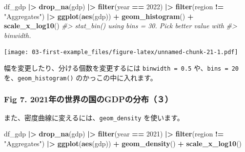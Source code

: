 \documentclass[
  xelatex, ja=standard]{bxjsbook}
\newenvironment{Shaded}{\begin{snugshade}}{\end{snugshade}}
\newcommand{\CommentTok}[1]{\textcolor[rgb]{0.56,0.35,0.01}{\textit{#1}}}
\newcommand{\DecValTok}[1]{\textcolor[rgb]{0.00,0.00,0.81}{#1}}
\newcommand{\FunctionTok}[1]{\textcolor[rgb]{0.13,0.29,0.53}{\textbf{#1}}}
\newcommand{\NormalTok}[1]{#1}
\newcommand{\SpecialCharTok}[1]{\textcolor[rgb]{0.81,0.36,0.00}{\textbf{#1}}}
\newcommand{\StringTok}[1]{\textcolor[rgb]{0.31,0.60,0.02}{#1}}
\theoremstyle{definition}
\theoremstyle{definition}
\theoremstyle{definition}
\theoremstyle{definition}
\theoremstyle{remark}
\begin{document}
\begin{Shaded}
\begin{Highlighting}[]
\NormalTok{df\_gdp }\SpecialCharTok{|\textgreater{}} \FunctionTok{drop\_na}\NormalTok{(gdp) }\SpecialCharTok{|\textgreater{}} 
  \FunctionTok{filter}\NormalTok{(year }\SpecialCharTok{==} \DecValTok{2022}\NormalTok{) }\SpecialCharTok{|\textgreater{}} \FunctionTok{filter}\NormalTok{(region }\SpecialCharTok{!=} \StringTok{"Aggregates"}\NormalTok{) }\SpecialCharTok{|\textgreater{}}
  \FunctionTok{ggplot}\NormalTok{(}\FunctionTok{aes}\NormalTok{(gdp)) }\SpecialCharTok{+} \FunctionTok{geom\_histogram}\NormalTok{() }\SpecialCharTok{+} \FunctionTok{scale\_x\_log10}\NormalTok{()}
\CommentTok{\#\textgreater{} \textasciigrave{}stat\_bin()\textasciigrave{} using \textasciigrave{}bins = 30\textasciigrave{}. Pick better value with}
\CommentTok{\#\textgreater{} \textasciigrave{}binwidth\textasciigrave{}.}
\end{Highlighting}
\end{Shaded}

\texttt{[image: 03-first-example\_files/figure-latex/unnamed-chunk-21-1.pdf]}

幅を変更したり、分ける個数を変更するには \texttt{binwidth\ =\ 0.5} や、\texttt{bins\ =\ 20} を、\texttt{geom\_histogram()} のかっこの中に入れます。

\hypertarget{fig-7.-2021ux5e74ux306eux4e16ux754cux306eux56fdux306egdpux306eux5206ux5e03uxff13}{%
\subsubsection{Fig 7. 2021年の世界の国のGDPの分布（３）}\label{fig-7.-2021ux5e74ux306eux4e16ux754cux306eux56fdux306egdpux306eux5206ux5e03uxff13}}

また、密度曲線に変えるには、\texttt{geom\_density} を使います。

\begin{Shaded}
\begin{Highlighting}[]
\NormalTok{df\_gdp }\SpecialCharTok{|\textgreater{}} \FunctionTok{drop\_na}\NormalTok{(gdp) }\SpecialCharTok{|\textgreater{}} 
  \FunctionTok{filter}\NormalTok{(year }\SpecialCharTok{==} \DecValTok{2021}\NormalTok{) }\SpecialCharTok{|\textgreater{}} \FunctionTok{filter}\NormalTok{(region }\SpecialCharTok{!=} \StringTok{"Aggregates"}\NormalTok{) }\SpecialCharTok{|\textgreater{}}
  \FunctionTok{ggplot}\NormalTok{(}\FunctionTok{aes}\NormalTok{(gdp)) }\SpecialCharTok{+} \FunctionTok{geom\_density}\NormalTok{() }\SpecialCharTok{+} \FunctionTok{scale\_x\_log10}\NormalTok{()}
\end{Highlighting}
\end{Shaded}
\end{document}
